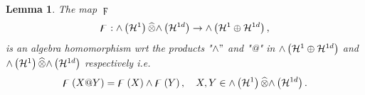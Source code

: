 \documentclass[aps,preprint]{revtex4}%
\newtheorem{lemma}[theorem]{Lemma}
\begin{document}
\begin{lemma}
The map $\digamma$
\begin{equation}
\digamma:{\huge \wedge}\left(  \mathcal{H}^{1}\right)  \widehat{\otimes
}{\huge \wedge}\left(  \mathcal{H}^{1d}\right)  \rightarrow{\huge \wedge
}\left(  \mathcal{H}^{1}\oplus\mathcal{H}^{1d}\right)  ,
\end{equation}
\emph{is an algebra homomorphism} wrt the products "$\wedge"$ and "@" in
${\huge \wedge}\left(  \mathcal{H}^{1}\oplus\mathcal{H}^{1d}\right)  $ and
${\huge \wedge}\left(  \mathcal{H}^{1}\right)  \widehat{\otimes}{\huge \wedge
}\left(  \mathcal{H}^{1d}\right)  $ respectively i.e.%
\begin{equation}
\digamma\left(  X@Y\right)  =\digamma\left(  X\right)  \wedge\digamma\left(
Y\right)  ,\quad X,Y\in{\huge \wedge}\left(  \mathcal{H}^{1}\right)
\widehat{\otimes}{\huge \wedge}\left(  \mathcal{H}^{1d}\right)  .
\end{equation}

\end{lemma}
\end{document}
